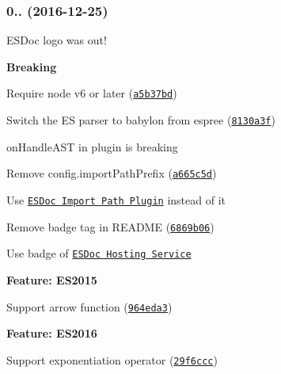 \subsubsection*{0.. (2016-\/12-\/25)}

E\+S\+Doc logo was out!




\begin{DoxyItemize}
\item {\bfseries Breaking}
\begin{DoxyItemize}
\item Require node v6 or later (\href{https://github.com/esdoc/esdoc/commit/a5b37bd0c68304214185f765f617b1077bee81b7}{\tt a5b37bd})
\item Switch the ES parser to babylon from espree (\href{https://github.com/esdoc/esdoc/commit/8130a3f42b497e81f9ec6fc4cf0ef07ed5a7fa22}{\tt 8130a3f})
\begin{DoxyItemize}
\item {\ttfamily on\+Handle\+A\+ST} in plugin is breaking
\end{DoxyItemize}
\item Remove {\ttfamily config.\+import\+Path\+Prefix} (\href{https://github.com/esdoc/esdoc/commit/a665c5d8c2c2a58cbe108ab3ecc8afc346c80ccf}{\tt a665c5d})
\begin{DoxyItemize}
\item Use \href{https://github.com/esdoc/esdoc-importpath-plugin}{\tt E\+S\+Doc Import Path Plugin} instead of it
\end{DoxyItemize}
\item Remove {\ttfamily badge tag} in R\+E\+A\+D\+ME (\href{https://github.com/esdoc/esdoc/commit/6869b06e293c2471978ef96882baef6cc14c1766}{\tt 6869b06})
\begin{DoxyItemize}
\item Use badge of \href{https://doc.esdoc.org}{\tt E\+S\+Doc Hosting Service}
\end{DoxyItemize}
\end{DoxyItemize}
\item {\bfseries Feature\+: E\+S2015}
\begin{DoxyItemize}
\item Support {\ttfamily arrow function} (\href{https://github.com/esdoc/esdoc/commit/964eda3d4e2da6e5d92b3a6502a4b2d01422b692}{\tt 964eda3})
\end{DoxyItemize}
\item {\bfseries Feature\+: E\+S2016}
\begin{DoxyItemize}
\item Support {\ttfamily exponentiation operator} (\href{https://github.com/esdoc/esdoc/commit/29f6ccced4256016fed4ac8eb5b98320cd78c4d7}{\tt 29f6ccc})

\end{DoxyItemize}
\end{DoxyItemize}
